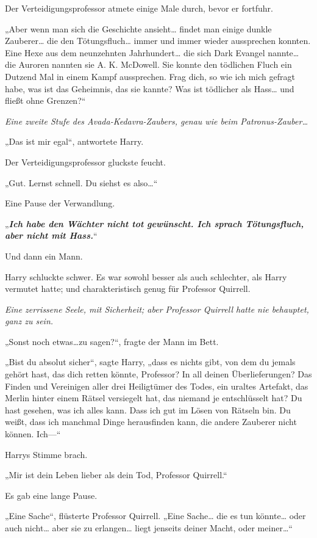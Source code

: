 {Der Verteidigungsprofessor atmete einige Male durch, bevor er fortfuhr.

„Aber wenn man sich die Geschichte ansieht… findet man einige dunkle Zauberer… die den Tötungsfluch… immer und immer wieder aussprechen konnten. Eine Hexe aus dem neunzehnten Jahrhundert… die sich Dark Evangel nannte… die Auroren nannten sie A. K. McDowell. Sie konnte den tödlichen Fluch ein Dutzend Mal in einem Kampf aussprechen. Frag dich, so wie ich mich gefragt habe, was ist das Geheimnis, das sie kannte? Was ist tödlicher als Hass… und fließt ohne Grenzen?“

\emph{Eine zweite Stufe des Avada-Kedavra-Zaubers, genau wie beim Patronus-Zauber…}

„Das ist mir egal“, antwortete Harry.

Der Verteidigungsprofessor gluckste feucht.

„Gut. Lernst schnell. Du siehst es also…“

Eine Pause der Verwandlung.

„\textbf{\emph{Ich habe den Wächter nicht tot gewünscht. Ich sprach Tötungsfluch, aber nicht mit Hass.}}“

Und dann ein Mann.

Harry schluckte schwer. Es war sowohl besser als auch schlechter, als Harry vermutet hatte; und charakteristisch genug für Professor Quirrell.

\emph{Eine zerrissene Seele, mit Sicherheit; aber Professor Quirrell hatte nie behauptet, ganz zu sein.}

„Sonst noch etwas…zu sagen?“, fragte der Mann im Bett.

„Bist du absolut sicher“, sagte Harry, „dass es nichts gibt, von dem du jemals gehört hast, das dich retten könnte, Professor? In all deinen Überlieferungen? Das Finden und Vereinigen aller drei Heiligtümer des Todes, ein uraltes Artefakt, das Merlin hinter einem Rätsel versiegelt hat, das niemand je entschlüsselt hat? Du hast gesehen, was ich alles kann. Dass ich gut im Lösen von Rätseln bin. Du weißt, dass ich manchmal Dinge herausfinden kann, die andere Zauberer nicht können. Ich—“

Harrys Stimme brach.

„Mir ist dein Leben lieber als dein Tod, Professor Quirrell.“

Es gab eine lange Pause.

„Eine Sache“, flüsterte Professor Quirrell. „Eine Sache… die es tun könnte… oder auch nicht… aber sie zu erlangen… liegt jenseits deiner Macht, oder meiner…“

}
